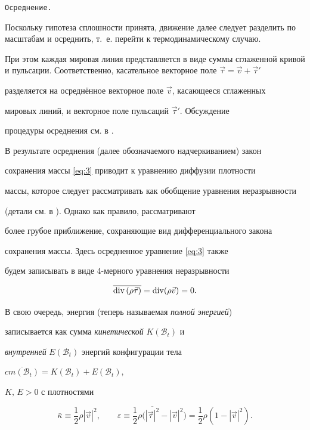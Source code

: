 \smallskip



{\tt Осреднение.}

Поскольку гипотеза сплошности принята, движение далее следует разделить по масштабам и осреднить, т.~е. перейти к термодинамическому случаю.

При этом каждая мировая линия представляется в виде суммы сглаженной кривой и пульсации. Соответственно, касательное векторное поле $\vec{\tau}=\vec{v}+\vec{\tau}'$

разделяется на осреднённое векторное поле $\vec{v}$, касающееся сглаженных

мировых линий, и векторное поле пульсаций $\vec{\tau}'$. Обсуждение

процедуры осреднения см. в \cite{Belevich04,Belevich09}.



В результате осреднения (далее обозначаемого надчеркиванием) закон

сохранения массы \eqref{eq:3} приводит к уравнению диффузии плотности

массы, которое следует рассматривать как обобщение уравнения неразрывности

(детали см. в \cite{Belevich09}). Однако как правило,  рассматривают

более грубое приближение, сохраняющие вид дифференциального закона

сохранения массы. Здесь осредненное уравнение \eqref{eq:3} также

будем записывать в виде 4-мерного уравнения неразрывности

\[

\overline{\textnormal{div}\left(\rho\vec{\tau}\right)}=\textnormal{div}(\rho\vec{v})=0.

\]





В свою очередь, энергия (теперь называемая \emph{полной энергией})

записывается как сумма \emph{кинетической} $K(\mathcal{B}_{t})$ и

\emph{внутренней} $E(\mathcal{B}_{t})$ энергий конфигурации тела

$\overline{cm(\mathcal{B}_{t})}=K(\mathcal{B}_{t})+E(\mathcal{B}_{t}),$

$K,\, E>0$ с плотностями 

\begin{equation}

\bar{\kappa}\equiv\frac{1}{2}\rho\left|\vec{v}\right|^{2},\qquad\varepsilon\equiv\frac{1}{2}\rho\bigl(\overline{|\vec{\tau}|^{2}}-|\vec{v}|^{2}\bigr)=\frac{1}{2}\rho\left(1-|\vec{v}|^{2}\right).

\label{eq:5}

\end{equation}


